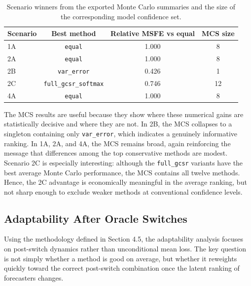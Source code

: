 \documentclass[11pt,a4paper]{article}
\begin{document}
\begin{table}[htbp]
\centering
\small
\begin{tabular}{lccc}
\toprule
Scenario & Best method & Relative MSFE vs equal & MCS size \\
\midrule
1A & \texttt{equal} & 1.000 & 8 \\
2A & \texttt{equal} & 1.000 & 8 \\
2B & \texttt{var\_error} & 0.426 & 1 \\
2C & \texttt{full\_gcsr\_softmax} & 0.746 & 12 \\
4A & \texttt{equal} & 1.000 & 8 \\
\bottomrule
\end{tabular}
\caption{Scenario winners from the exported Monte Carlo summaries and the size of the corresponding model confidence set.}
\label{tab:mc-winners}
\end{table}

The MCS results are useful because they show where these numerical gains are statistically decisive and where they are not. In 2B, the MCS collapses to a singleton containing only \texttt{var\_error}, which indicates a genuinely informative ranking. In 1A, 2A, and 4A, the MCS remains broad, again reinforcing the message that differences among the top conservative methods are modest. Scenario 2C is especially interesting: although the \texttt{full\_gcsr} variants have the best average Monte Carlo performance, the MCS contains all twelve methods. Hence, the 2C advantage is economically meaningful in the average ranking, but not sharp enough to exclude weaker methods at conventional confidence levels.

\subsection{Adaptability After Oracle Switches}

Using the methodology defined in Section 4.5, the adaptability analysis focuses on post-switch dynamics rather than unconditional mean loss. The key question is not simply whether a method is good on average, but whether it reweights quickly toward the correct post-switch combination once the latent ranking of forecasters changes.
\end{document}
